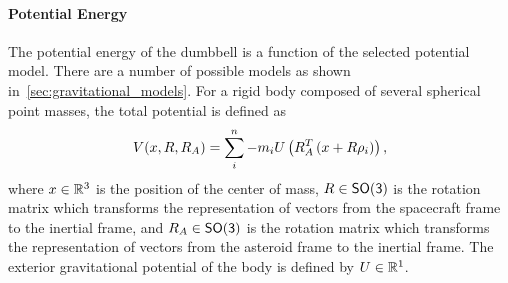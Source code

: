\paragraph{Potential Energy}
The potential energy of the dumbbell is a function of the selected potential model.
There are a number of possible models as shown in~\cref{sec:gravitational_models}.
For a rigid body composed of several spherical point masses, the total potential is defined as
\begin{align}\label{eq:inertial_potential_energy}
    V(x, R, R_A) = \sum_{i}^n - m_i U \left( R_A^T \left( x + R \rho_i \right) \right),
\end{align}
where \( x \in \mathbb{R}^3\) is the position of the center of mass, \( R \in \mathsf{SO(3)}\) is the rotation matrix which transforms the representation of vectors from the spacecraft frame to the inertial frame, and \( R_A \in \mathsf{SO(3)} \) is the rotation matrix which transforms the representation of vectors from the asteroid frame to the inertial frame.
The exterior gravitational potential of the body is defined by \( U \in \mathbb{R}^1 \).

